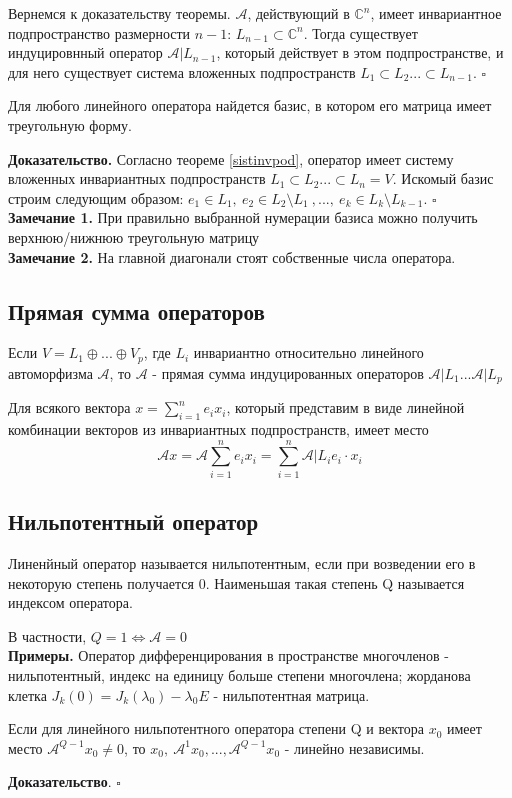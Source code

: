 Вернемся к доказательству теоремы. $\mathcal A$, действующий в $\mathbb C^n$,
имеет инвариантное подпространство размерности $n-1$: $L_{n-1}\subset 
\mathbb C^n$. Тогда существует индуцировнный оператор $\mathcal A|L_{n-1}$,
который действует в этом подпространстве, и для него существует система 
вложенных подпространств $L_1\subset L_2...\subset L_{n-1}$. $\square$
\begin{theor}
Для любого линейного оператора найдется базис, в котором его матрица имеет 
треугольную форму.
\end{theor}
\textbf{Доказательство.} Согласно теореме \ref{sistinvpod}, оператор имеет 
систему вложенных инвариантных подпространств $L_1\subset L_2...\subset L_n=V$.
Искомый базис строим следующим образом: $e_1\in L_1,~e_2\in L_2\setminus
L_1~,...,~e_k\in L_k\setminus L_{k-1}$. $\square$\\
\textbf{Замечание 1.} При правильно выбранной нумерации базиса можно получить
верхнюю/нижнюю треугольную матрицу\\
\textbf{Замечание 2.} На главной диагонали стоят собственные числа оператора.

\subsection{Прямая сумма операторов}
\begin{defin}
Если $V=L_1\oplus...\oplus V_p$, где $L_i$ инвариантно относительно линейного
автоморфизма $\mathcal A$, то $\mathcal A$ - прямая сумма индуцированных
операторов $\mathcal A|L_1...\mathcal A|L_p$
\end{defin}
Для всякого вектора $x=\sum\limits_{i=1}^ne_ix_i$, который представим в виде
линейной комбинации векторов из инвариантных подпространств, имеет место 
$$\mathcal Ax=\mathcal A\sum\limits_{i=1}^ne_i x_i=\sum\limits_{i=1}^n\mathcal
A|L_ie_i\cdot x_i$$

\subsection{Нильпотентный оператор}
\begin{defin}
Линенйный оператор называется нильпотентным, если при возведении его в 
некоторую степень получается 0. Наименьшая такая степень Q называется индексом
оператора.
\end{defin}
В частности, $Q=1\Leftrightarrow\mathcal A=0$\\
\textbf{Примеры.} Оператор дифференцирования в пространстве многочленов -
нильпотентный, индекс на единицу больше степени многочлена; жорданова клетка
$J_k(0)=J_k(\lambda_0)-\lambda_0E$ - нильпотентная матрица.
\begin{theor}
 Если для линейного нильпотентного оператора степени Q и вектора $x_0$ имеет 
 место $\mathcal A^{Q-1}x_0\ne0$, то $x_0,~\mathcal A^1x_0,...,\mathcal 
 A^{Q-1}x_0$ - линейно независимы.
\end{theor}
\textbf{Доказательство}.  $\square$


